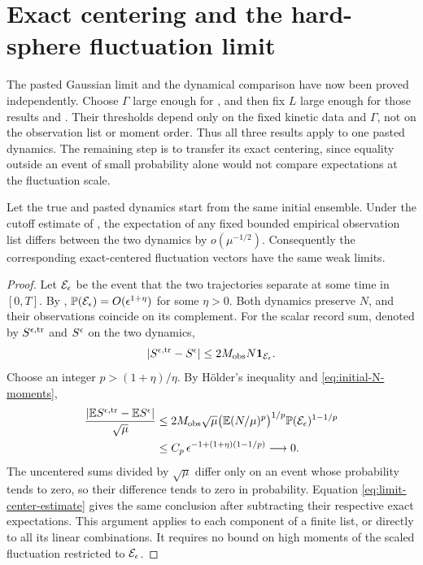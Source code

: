 \section{Exact centering and the hard-sphere fluctuation limit}
\label{sec:transfer}

The pasted Gaussian limit and the dynamical comparison have now been
proved independently.  Choose \(\Gamma\) large enough for
, and then fix \(L\) large
enough for those results and .  Their
thresholds depend only on the fixed kinetic data and \(\Gamma\),
not on the observation list or moment order.  Thus all three results
apply to one pasted dynamics.  The remaining step is to transfer its
exact centering, since equality outside an event of small probability
alone would not compare expectations at the fluctuation scale.

\begin{lemma}\label{lem:center-transfer}
Let the true and pasted dynamics start from the same initial ensemble.
Under the cutoff estimate of , the expectation of
any fixed bounded empirical observation list differs between the two
dynamics by \(o(\mu^{-1/2})\).  Consequently the corresponding
exact-centered fluctuation vectors have the same weak limits.
\end{lemma}

\begin{proof}
Let \(\mathcal E_\epsilon\) be the event that the two trajectories separate
at some time in \([0,T]\).  By ,
\(\mathbb P(\mathcal E_\epsilon)=O(\epsilon^{1+\eta})\) for some \(\eta>0\).
Both dynamics preserve \(N\), and their observations coincide on its
complement.  For the scalar record sum, denoted by \(S^{\epsilon,\mathrm{tr}}\)
and \(S^\epsilon\) on the two dynamics,
\[
 |S^{\epsilon,\mathrm{tr}}-S^\epsilon|
       \le 2M_{\mathrm{obs}}N\mathbf 1_{\mathcal E_\epsilon}.
\]
Choose an integer \(p>(1+\eta)/\eta\).  By Hölder's inequality and
\eqref{eq:initial-N-moments},
\begin{equation}\label{eq:limit-center-estimate}
 \begin{split}
 \frac{|\mathbb E S^{\epsilon,\mathrm{tr}}-\mathbb E S^\epsilon|}{\sqrt\mu}
 &\le 2M_{\mathrm{obs}}\sqrt\mu
       \bigl(\mathbb E(N/\mu)^p\bigr)^{1/p}
            \mathbb P(\mathcal E_\epsilon)^{1-1/p}\\
 &\le C_p\,\epsilon^{-1+(1+\eta)(1-1/p)}
       \longrightarrow0.
 \end{split}
\end{equation}
The uncentered sums divided by \(\sqrt\mu\) differ only on an event
whose probability tends to zero, so their difference tends to zero
in probability.  Equation \eqref{eq:limit-center-estimate} gives the
same conclusion after subtracting their respective exact
expectations.  This argument applies to each component of a finite
list, or directly to all its linear combinations.  It requires no
bound on high moments of the scaled fluctuation restricted to
\(\mathcal E_\epsilon\).
\end{proof}

